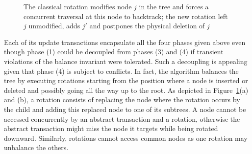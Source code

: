 \begin{figure}
\begin{center}
	\caption{The classical rotation modifies node $j$ in the tree and forces a concurrent traversal at this node to backtrack; the new rotation left $j$ unmodified, adds $j'$ and postpones the 
	physical deletion of $j$\label{fig:rotation}}
	\end{center}
\end{figure}


Each of its update transactions encapsulate all the four phases given above even though phase (1) could be decoupled 
from phases (3) and (4) if transient violations of the balance invariant were tolerated.
Such a decoupling is appealing given that phase (4) is subject to conflicts.
In fact, the algorithm balances the tree by executing rotations starting from the position where a node is inserted or deleted 
and possibly going all the way up to the root. As depicted in Figure~\ref{fig:rotation}(a) and (b), a rotation consists of 
replacing the node where the rotation occurs by the child and adding this replaced node to one of its subtrees.
A node cannot be accessed concurrently by an abstract transaction and a rotation, otherwise the abstract transaction might miss the node it 
targets while being rotated downward. Similarly, rotations cannot access common nodes as one rotation may unbalance the others.

